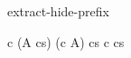 \begin{circuslaw}{extract-hide-prefix}
\begin{circusaction*}
  c \then (A \circhide cs) \; \equiv \; (c \then A) \circhide cs
  \also
  \provided \; c \notin cs
\end{circusaction*}
\end{circuslaw}
